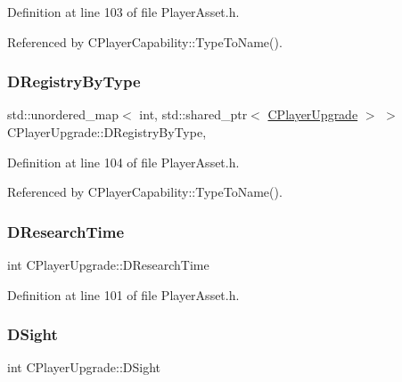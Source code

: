 Definition at line 103 of file Player\+Asset.\+h.



Referenced by C\+Player\+Capability\+::\+Type\+To\+Name().

\hypertarget{classCPlayerUpgrade_a04673f65215501e9eb0ce7828091c30c}{}\label{classCPlayerUpgrade_a04673f65215501e9eb0ce7828091c30c} 
\subsubsection{\texorpdfstring{D\+Registry\+By\+Type}{DRegistryByType}}
{\footnotesize\ttfamily std\+::unordered\+\_\+map$<$ int, std\+::shared\+\_\+ptr$<$ \hyperlink{classCPlayerUpgrade}{C\+Player\+Upgrade} $>$ $>$ C\+Player\+Upgrade\+::\+D\+Registry\+By\+Type\hspace{0.3cm}{\ttfamily [static]}, {\ttfamily [protected]}}



Definition at line 104 of file Player\+Asset.\+h.



Referenced by C\+Player\+Capability\+::\+Type\+To\+Name().

\hypertarget{classCPlayerUpgrade_ae233bf472f72c8f16a6f1b1ea3b78012}{}\label{classCPlayerUpgrade_ae233bf472f72c8f16a6f1b1ea3b78012} 
\subsubsection{\texorpdfstring{D\+Research\+Time}{DResearchTime}}
{\footnotesize\ttfamily int C\+Player\+Upgrade\+::\+D\+Research\+Time\hspace{0.3cm}{\ttfamily [protected]}}



Definition at line 101 of file Player\+Asset.\+h.

\hypertarget{classCPlayerUpgrade_ad07eacdeddddd94cf9766dc04d380b55}{}\label{classCPlayerUpgrade_ad07eacdeddddd94cf9766dc04d380b55} 
\subsubsection{\texorpdfstring{D\+Sight}{DSight}}
{\footnotesize\ttfamily int C\+Player\+Upgrade\+::\+D\+Sight\hspace{0.3cm}{\ttfamily [protected]}}



